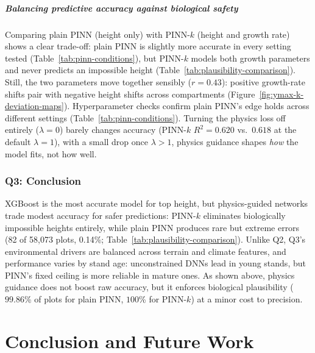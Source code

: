 \documentclass[logo,msc,ai]{infthesis}           %
\begin{document}
\paragraph*{Balancing predictive accuracy against biological safety}
Comparing plain PINN (height only) with PINN-$k$ (height and growth rate) shows a clear trade-off: plain PINN is slightly more accurate in every setting tested (Table~\ref{tab:pinn-conditions}), but PINN-$k$ models both growth parameters and never predicts an impossible height (Table~\ref{tab:plausibility-comparison}). Still, the two parameters move together sensibly ($r = 0.43$): positive growth-rate shifts pair with negative height shifts across compartments (Figure~\ref{fig:ymax-k-deviation-maps}). Hyperparameter checks confirm plain PINN's edge holds across different settings (Table~\ref{tab:pinn-conditions}). Turning the physics loss off entirely ($\lambda = 0$) barely changes accuracy (PINN-$k$ $R^2 = 0.620$ vs.\ $0.618$ at the default $\lambda = 1$), with a small drop once $\lambda > 1$, physics guidance shapes \emph{how} the model fits, not how well.

\subsection*{Q3: Conclusion}
XGBoost is the most accurate model for top height, but physics-guided networks trade modest accuracy for safer predictions: PINN-$k$ eliminates biologically impossible heights entirely, while plain PINN produces rare but extreme errors (82 of 58,073 plots, 0.14\%; Table~\ref{tab:plausibility-comparison}). Unlike Q2, Q3's environmental drivers are balanced across terrain and climate features, and performance varies by stand age: unconstrained DNNs lead in young stands, but PINN's fixed ceiling is more reliable in mature ones. As shown above, physics guidance does not boost raw accuracy, but it enforces biological plausibility ($99.86$\% of plots for plain PINN, $100$\% for PINN-$k$) at a minor cost to precision.


\chapter{Conclusion and Future Work}
\label{ch:conc}
\end{document}
